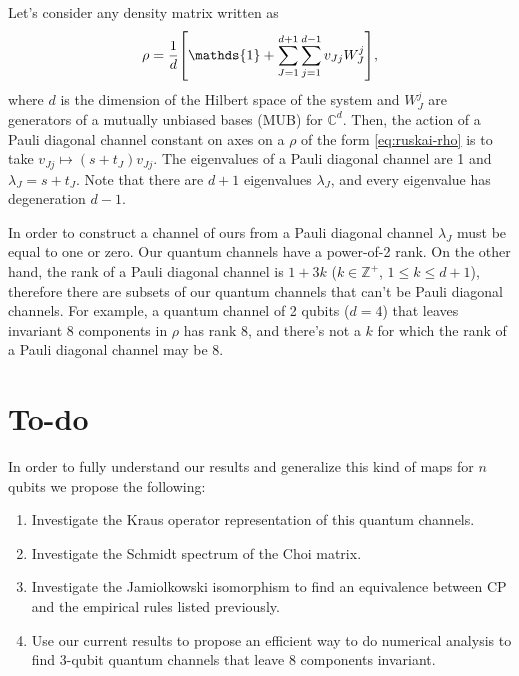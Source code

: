 \documentclass[11pt,dvipsnames]{article} %
\newcommand{\1}{\mathds{1}}
\begin{document}
Let's consider any density matrix written as
\begin{align}
	\rho = \frac{1}{d}\qty[\1 + \sum _{J=1}^{d+1} \sum _{j=1}^{d-1}
	v_{Jj}W_J^j],
	\label{eq:ruskai-rho}
\end{align}
where $d$ is the dimension of the Hilbert space of the system and $W_J^j$ 
are generators of a mutually unbiased bases (MUB) for $\mathbb{C}^{d}$.
Then, the action of a Pauli diagonal channel constant on axes on a 
$\rho$ of the form \eqref{eq:ruskai-rho} is to take 
$v_{Jj}\mapsto (s+t_J)v_{Jj}$. The eigenvalues of a Pauli diagonal channel
are 1 and $\lambda _J=s+t_J$. Note that there are $d+1$ eigenvalues 
$\lambda_J$, and every eigenvalue has degeneration $d-1$. 

In order to construct a channel of ours from a 
Pauli diagonal channel $\lambda_J$ must be equal to one or zero. Our
quantum channels have a power-of-2 rank. On the other hand, 
the rank of a Pauli diagonal channel is $1+3k$ ($k\in \mathbb{Z}^+$,
$1\leq k\leq d+1$),
therefore there are subsets of our quantum channels that can't be  
Pauli diagonal channels. For example, a quantum channel of 2 qubits 
($d=4$) that leaves invariant 8 components in $\rho$ has rank 8, and
there's not a $k$ for which the rank of a Pauli diagonal channel may be 8.



\section*{To-do} %
In order to fully understand our results and generalize this kind of maps 
for $n$ qubits we propose the following:
\begin{enumerate}
\item Investigate the Kraus operator representation of this quantum channels.
\item Investigate the Schmidt spectrum of the Choi matrix.
\item Investigate the Jamiolkowski isomorphism to find an equivalence between
CP and the empirical rules listed previously.
\item Use our current results to propose an efficient way to do numerical
analysis to find 3-qubit quantum channels that leave 8 components invariant.
\end{enumerate}


\vfill
\end{document}
